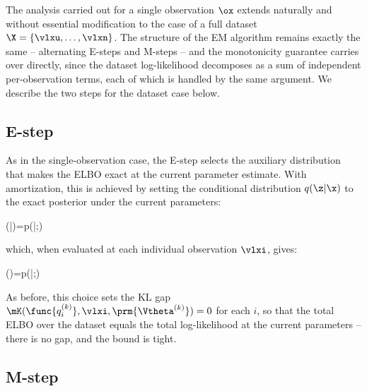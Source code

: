 The analysis carried out for a single observation $\ox$ extends naturally and without essential modification to the case of a full dataset $\X = \{\vlxu,\ldots,\vlxn\}$. The structure of the EM algorithm remains exactly the same -- alternating E-steps and M-steps -- and the monotonicity guarantee carries over directly, since the dataset log-likelihood decomposes as a sum of independent per-observation terms, each of which is handled by the same argument. We describe the two steps for the dataset case below.

\subsection*{E-step}

As in the single-observation case, the E-step selects the auxiliary distribution that makes the ELBO exact at the current parameter estimate. With amortization, this is achieved by setting the conditional distribution $q(\z|\x)$ to the exact posterior under the current parameters:
\begin{myequation}
(\z|\x)=p(\z|\x ;)
\end{myequation}
which, when evaluated at each individual observation $\vlxi$, gives:
\begin{myequation}
(\z)=p(\z|\vlxi ;)
\end{myequation}
As before, this choice sets the KL gap $\mK(\func{q^{(k)}_i}, \vlxi, \prm{\Vtheta^{(k)}}) = 0$ for each $i$, so that the total ELBO over the dataset equals the total log-likelihood at the current parameters -- there is no gap, and the bound is tight.

\subsection*{M-step}

